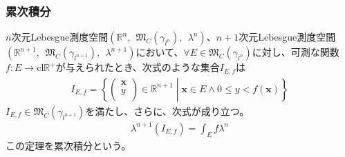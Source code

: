 \documentclass[dvipdfmx]{jsarticle}
\begin{document}
\subsubsection{累次積分}%
\begin{thm}[累次積分]\label{4.6.6.7}
$n$次元Lebesgue測度空間$\left( \mathbb{R}^{n},\ \ \mathfrak{M}_{C}\left( \gamma_{l^{n}} \right),\ \ \lambda^{n} \right)$、$n + 1$次元Lebesgue測度空間$\left( \mathbb{R}^{n + 1},\ \ \mathfrak{M}_{C}\left( \gamma_{l^{n + 1}} \right),\ \ \lambda^{n + 1} \right)$において、$\forall E \in \mathfrak{M}_{C}\left( \gamma_{l^{n}} \right)$に対し、可測な関数$f:E \rightarrow \mathrm{cl}\mathbb{R}^{+}$が与えられたとき、次式のような集合$I_{E,f}$は
\begin{align*}
I_{E,f} = \left\{ \begin{pmatrix}
\mathbf{x} \\
y \\
\end{pmatrix} \in \mathbb{R}^{n + 1} \middle| \mathbf{x} \in E \land 0 \leq y < f\left( \mathbf{x} \right) \right\}
\end{align*}
$I_{E,f} \in \mathfrak{M}_{C}\left( \gamma_{l^{n + 1}} \right)$を満たし、さらに、次式が成り立つ。
\begin{align*}
\lambda^{n + 1}\left( I_{E,f} \right) = \int_{E} {f\lambda^{n}}
\end{align*}
この定理を累次積分という。
\end{thm}
\end{document}
